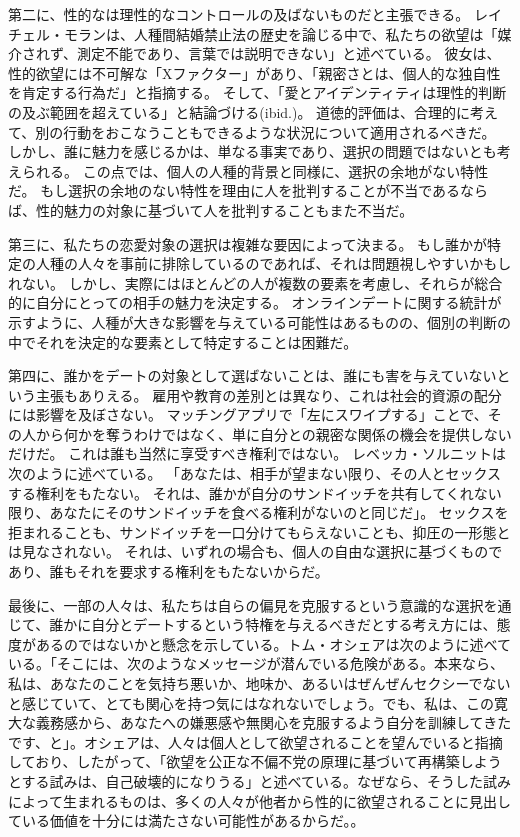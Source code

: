 \documentclass[paper=a4,book,openany]{jlreq}
\begin{document}
第二に、性的なは理性的なコントロールの及ばないものだと主張できる。
レイチェル・モランは、人種間結婚禁止法の歴史を論じる中で、私たちの欲望は「媒介されず、測定不能であり、言葉では説明できない」と述べている\citep[p.14]{moran01:_inter_intim}。
彼女は、性的欲望には不可解な「Xファクター」があり、「親密さとは、個人的な独自性を肯定する行為だ」と指摘する。
そして、「愛とアイデンティティは理性的判断の及ぶ範囲を超えている」と結論づける(ibid.)。
道徳的評価は、合理的に考えて、別の行動をおこなうこともできるような状況について適用されるべきだ。
しかし、誰に魅力を感じるかは、単なる事実であり、選択の問題ではないとも考えられる。
この点では、個人の人種的背景と同様に、選択の余地がない特性だ。
もし選択の余地のない特性を理由に人を批判することが不当であるならば、性的魅力の対象に基づいて人を批判することもまた不当だ。

第三に、私たちの恋愛対象の選択は複雑な要因によって決まる。
もし誰かが特定の人種の人々を事前に排除しているのであれば、それは問題視しやすいかもしれない。
しかし、実際にはほとんどの人が複数の要素を考慮し、それらが総合的に自分にとっての相手の魅力を決定する。
オンラインデートに関する統計が示すように、人種が大きな影響を与えている可能性はあるものの、個別の判断の中でそれを決定的な要素として特定することは困難だ。

第四に、誰かをデートの対象として選ばないことは、誰にも害を与えていないという主張もありえる。
雇用や教育の差別とは異なり、これは社会的資源の配分には影響を及ぼさない。
マッチングアプリで「左にスワイプする」ことで、その人から何かを奪うわけではなく、単に自分との親密な関係の機会を提供しないだけだ。
これは誰も当然に享受すべき権利ではない。
レベッカ・ソルニットは次のように述べている。
「あなたは、相手が望まない限り、その人とセックスする権利をもたない。
それは、誰かが自分のサンドイッチを共有してくれない限り、あなたにそのサンドイッチを食べる権利がないのと同じだ」\citep{solnit15:_men_explain_lolit_me}。
セックスを拒まれることも、サンドイッチを一口分けてもらえないことも、抑圧の一形態とは見なされない。
それは、いずれの場合も、個人の自由な選択に基づくものであり、誰もそれを要求する権利をもたないからだ。

最後に、一部の人々は、私たちは自らの偏見を克服するという意識的な選択を通じて、誰かに自分とデートするという特権を与えるべきだとする考え方には、態度があるのではないかと懸念を示している。トム・オシェアは次のように述べている。「そこには、次のようなメッセージが潜んでいる危険がある。本来なら、私は、あなたのことを気持ち悪いか、地味か、あるいはぜんぜんセクシーでないと感じていて、とても関心を持つ気にはなれないでしょう。でも、私は、この寛大な義務感から、あなたへの嫌悪感や無関心を克服するよう自分を訓練してきたです、と」。オシェアは、人々は個人として欲望されることを望んでいると指摘しており、したがって、「欲望を公正な不偏不党の原理に基づいて再構築しようとする試みは、自己破壊的になりうる」と述べている。なぜなら、そうした試みによって生まれるものは、多くの人々が他者から性的に欲望されることに見出している価値を十分には満たさない可能性があるからだ\citep{oshea20:_sexual_desir_struc_injus}。。
\end{document}
